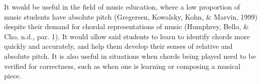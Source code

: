\documentclass{article}
\begin{document}
	It would be useful in the field of music education, where a low proportion of music students have absolute pitch (Gregersen, Kowalsky, Kohn, \& Marvin, 1999) despite their demand for chordal representations of music (Humphrey, Bello, \& Cho, n.d., par. 1). It would allow said students to learn to identify chords more quickly and accurately, and help them develop their senses of relative and absolute pitch. It is also useful in situations when chords being played need to be verified for correctness, such as when one is learning or composing a musical piece. \\
	
	
	
	
	
\end{document}
